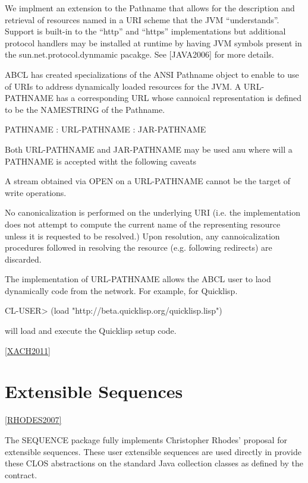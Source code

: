 \documentclass[10pt]{book}
\begin{document}
We implment an extension to the Pathname that allows for the
description and retrieval of resources named in a URI scheme that the
JVM ``understands''.  Support is built-in to the ``http'' and
``https'' implementations but additional protocol handlers may be
installed at runtime by having JVM symbols present in the
sun.net.protocol.dynmamic pacakge. See [JAVA2006] for more details.

ABCL has created specializations of the ANSI Pathname object to
enable to use of URIs to address dynamically loaded resources for the
JVM.  A URL-PATHNAME has a corresponding URL whose cannoical
representation is defined to be the NAMESTRING of the Pathname.

PATHNAME : URL-PATHNAME : JAR-PATHNAME

Both URL-PATHNAME and JAR-PATHNAME may be used anu where will a
PATHNAME is accepted witht the following caveats

A stream obtained via OPEN on a URL-PATHNAME cannot be the target of
write operations.

No canonicalization is performed on the underlying URI (i.e. the
implementation does not attempt to compute the current name of the
representing resource unless it is requested to be resolved.)  Upon
resolution, any cannoicalization procedures followed in resolving the
resource (e.g. following redirects) are discarded.  

The implementation of URL-PATHNAME allows the ABCL user to laod dynamically
code from the network.  For example, for Quicklisp.

\begin{listing-lisp}
  CL-USER> (load "http://beta.quicklisp.org/quicklisp.lisp")
\end{listing-lisp}

will load and execute the Quicklisp setup code.

\ref{XACH2011}
         
\section{Extensible Sequences}

\ref{RHODES2007}

The SEQUENCE package fully implements Christopher Rhodes' proposal for
extensible sequences.  These user extensible sequences are used
directly in  provide these CLOS
abstractions on the standard Java collection classes as defined by the
 contract.
\end{document}
